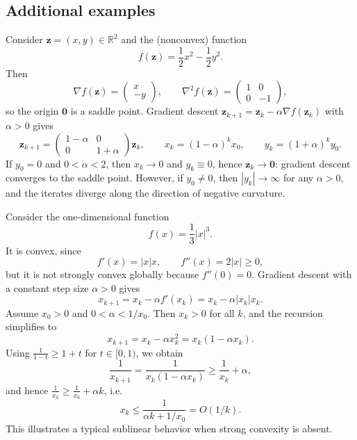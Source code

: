 \subsection{Additional examples}

\begin{example}
Consider $\mathbf{z}=(x,y)\in\mathbb{R}^2$ and the (nonconvex) function
\[
  f(\mathbf{z})=\frac{1}{2}x^2-\frac{1}{2}y^2.
\]
Then
\[
  \nabla f(\mathbf{z})=
  \begin{pmatrix}
    x\\
    -y
  \end{pmatrix},
  \qquad
  \nabla^2 f(\mathbf{z})=
  \begin{pmatrix}
    1 & 0\\
    0 & -1
  \end{pmatrix},
\]
so the origin $\mathbf{0}$ is a saddle point.
Gradient descent $\mathbf{z}_{k+1}=\mathbf{z}_k-\alpha \nabla f(\mathbf{z}_k)$ with $\alpha>0$ gives
\[
  \mathbf{z}_{k+1}=
  \begin{pmatrix}
    1-\alpha & 0\\
    0 & 1+\alpha
  \end{pmatrix}\mathbf{z}_k,
  \qquad
  x_{k}=(1-\alpha)^k x_0,
  \qquad
  y_{k}=(1+\alpha)^k y_0.
\]
If $y_0=0$ and $0<\alpha<2$, then $x_k\to 0$ and $y_k\equiv 0$, hence $\mathbf{z}_k\to\mathbf{0}$:
gradient descent converges to the saddle point.
However, if $y_0\ne 0$, then $|y_k|\to\infty$ for any $\alpha>0$, and the iterates diverge
along the direction of negative curvature.
\end{example}

\begin{example}
Consider the one-dimensional function
\[
  f(x)=\frac{1}{3}|x|^3.
\]
It is convex, since
\[
  f'(x)=|x|x,
  \qquad
  f''(x)=2|x|\ge 0,
\]
but it is not strongly convex globally because $f''(0)=0$.
Gradient descent with a constant step size $\alpha>0$ gives
\[
  x_{k+1}=x_k-\alpha f'(x_k)=x_k-\alpha |x_k|x_k.
\]
Assume $x_0>0$ and $0<\alpha<1/x_0$. Then $x_k>0$ for all $k$, and the recursion simplifies to
\[
  x_{k+1}=x_k-\alpha x_k^2=x_k(1-\alpha x_k).
\]
Using $\frac{1}{1-t}\ge 1+t$ for $t\in[0,1)$, we obtain
\[
  \frac{1}{x_{k+1}}
  =\frac{1}{x_k(1-\alpha x_k)}
  \ge \frac{1}{x_k}+\alpha,
\]
and hence $\frac{1}{x_k}\ge \frac{1}{x_0}+\alpha k$, i.e.
\[
  x_k\le \frac{1}{\alpha k+1/x_0}=O(1/k).
\]
This illustrates a typical sublinear behavior when strong convexity is absent.
\end{example}


